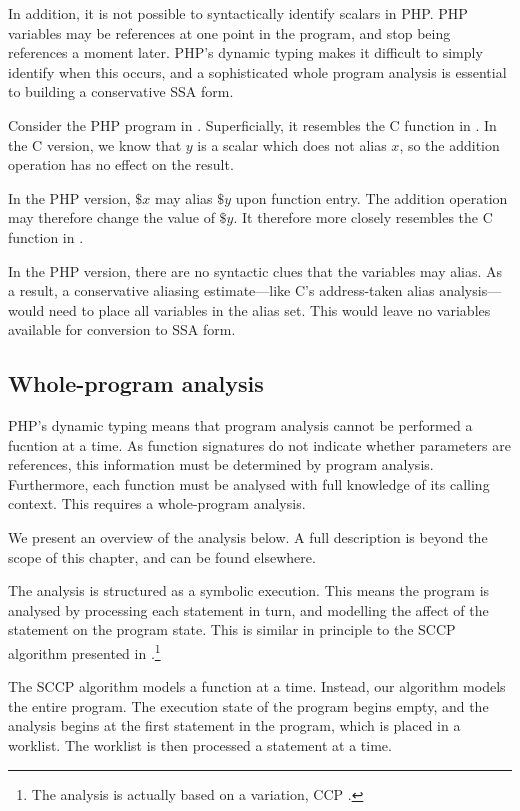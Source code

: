 In addition, it is not possible to syntactically identify scalars in PHP.
PHP variables may be references at one point in the program, and stop being references a moment later.
PHP's dynamic typing makes it difficult to simply identify when this occurs, and a sophisticated whole program analysis is essential to building a conservative SSA form.

Consider the PHP program in .
Superficially, it resembles the C function in .
In the C version, we know that $y$ is a scalar which does not alias $x$, so the addition operation has no effect on the result.

In the PHP version, $\$x$ may alias $\$y$ upon function entry.
The addition operation may therefore change the value of $\$y$.
It therefore more closely resembles the C function in .

In the PHP version, there are no syntactic clues that the variables may alias.
As a result, a conservative aliasing estimate---like C's address-taken alias analysis---would need to place all variables in the alias set.
This would leave no variables available for conversion to SSA form.


\subsection{Whole-program analysis}

PHP's dynamic typing means that program analysis cannot be performed a fucntion at a time.
As function signatures do not indicate whether parameters are references, this information must be determined by program analysis.
Furthermore, each function must be analysed with full knowledge of its calling context.
This requires a whole-program analysis.

We present an overview of the analysis below.
A full description is beyond the scope of this chapter, and can be found elsewhere\cite{thesis}.

The analysis is structured as a symbolic execution.
This means the program is analysed by processing each statement in turn, and modelling the affect of the statement on the program state.
This is similar in principle to the SCCP algorithm presented in .\footnote{The analysis is actually based on a variation, CCP \cite{pioli}.}

The SCCP algorithm models a function at a time.
Instead, our algorithm models the entire program.
The execution state of the program begins empty, and the analysis begins at the first statement in the program, which is placed in a worklist.
The worklist is then processed a statement at a time.

